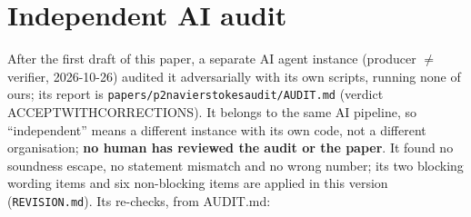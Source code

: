 \documentclass[10pt]{article}
\renewcommand{\_}{\textunderscore\allowbreak}
\begin{document}
\section{Independent AI audit}\label{sec:audit}
After the first draft of this paper, a separate AI agent instance (producer $\neq$ verifier, 2026-10-26) audited it adversarially with its own scripts, running none of ours; its report is \texttt{papers/p2\_navier\_stokes\_audit/AUDIT.md} (verdict ACCEPT\_WITH\_CORRECTIONS). It belongs to the same AI pipeline, so ``independent'' means a different instance with its own code, not a different organisation; \textbf{no human has reviewed the audit or the paper}. It found no soundness escape, no statement mismatch and no wrong number; its two blocking wording items and six non-blocking items are applied in this version (\texttt{REVISION.md}). Its re-checks, from AUDIT.md:
\end{document}
